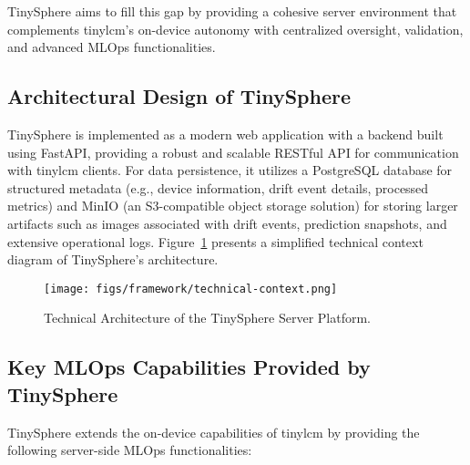 TinySphere aims to fill this gap by providing a cohesive server environment that complements \gls{tinylcm}'s on-device autonomy with centralized oversight, validation, and advanced MLOps functionalities.

\subsection{Architectural Design of TinySphere}
\label{ssec:tinysphere_architecture}

TinySphere is implemented as a modern web application with a backend built using FastAPI, providing a robust and scalable RESTful API for communication with \gls{tinylcm} clients. For data persistence, it utilizes a PostgreSQL database for structured metadata (e.g., device information, drift event details, processed metrics) and MinIO (an S3-compatible object storage solution) for storing larger artifacts such as images associated with drift events, prediction snapshots, and extensive operational logs. Figure~\ref{fig:tinysphere_technical_diagram} presents a simplified technical context diagram of TinySphere's architecture.

\begin{figure}[htbp]
    \centering
    \texttt{[image: figs/framework/technical-context.png]}
    \caption[Technical Architecture of the TinySphere Server Platform]{Technical Architecture of the TinySphere Server Platform.}
    \label{fig:tinysphere_technical_diagram}
\end{figure}

\subsection{Key MLOps Capabilities Provided by TinySphere}
\label{ssec:tinysphere_capabilities}

TinySphere extends the on-device capabilities of \gls{tinylcm} by providing the following server-side MLOps functionalities:

